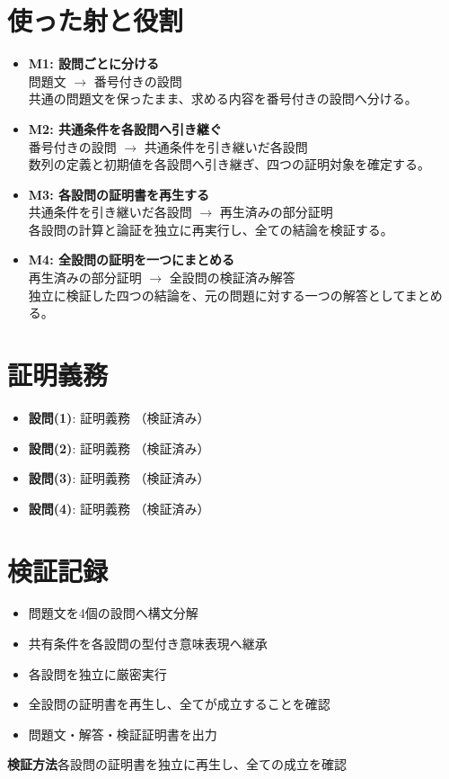 \documentclass[uplatex,dvipdfmx,11pt]{jsarticle}
\begin{document}
\section*{使った射と役割}
\begin{itemize}
\item \textbf{M1: 設問ごとに分ける}\\
問題文
$\longrightarrow$
番号付きの設問\\
共通の問題文を保ったまま、求める内容を番号付きの設問へ分ける。
\item \textbf{M2: 共通条件を各設問へ引き継ぐ}\\
番号付きの設問
$\longrightarrow$
共通条件を引き継いだ各設問\\
数列の定義と初期値を各設問へ引き継ぎ、四つの証明対象を確定する。
\item \textbf{M3: 各設問の証明書を再生する}\\
共通条件を引き継いだ各設問
$\longrightarrow$
再生済みの部分証明\\
各設問の計算と論証を独立に再実行し、全ての結論を検証する。
\item \textbf{M4: 全設問の証明を一つにまとめる}\\
再生済みの部分証明
$\longrightarrow$
全設問の検証済み解答\\
独立に検証した四つの結論を、元の問題に対する一つの解答としてまとめる。
\end{itemize}


\section*{証明義務}
\begin{itemize}
\item \textbf{設問(1)}: 証明義務 （検証済み）
\item \textbf{設問(2)}: 証明義務 （検証済み）
\item \textbf{設問(3)}: 証明義務 （検証済み）
\item \textbf{設問(4)}: 証明義務 （検証済み）
\end{itemize}


\section*{検証記録}
\begin{itemize}
\item 問題文を4個の設問へ構文分解
\item 共有条件を各設問の型付き意味表現へ継承
\item 各設問を独立に厳密実行
\item 全設問の証明書を再生し、全てが成立することを確認
\item 問題文・解答・検証証明書を出力
\end{itemize}
\noindent\textbf{検証方法}\quad 各設問の証明書を独立に再生し、全ての成立を確認
\par{}
\end{document}

